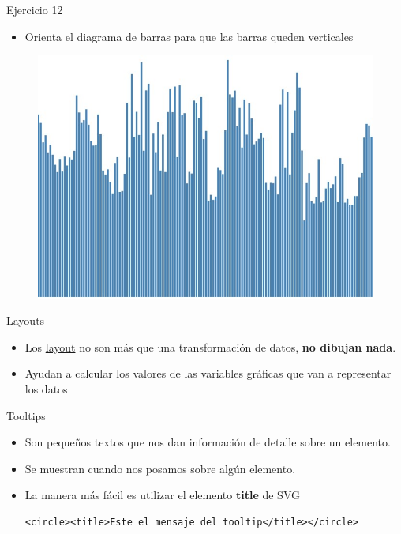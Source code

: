 \documentclass[ignorenonframetext,]{beamer}
\makeatletter
\def\ScaleIfNeededW{%
  \ifdim\Gin@nat@width>\linewidth
    \linewidth
  \else
    \Gin@nat@width
  \fi
}
\def\ScaleIfNeededH{%
  \ifdim\Gin@nat@height>0.6\textheight
    0.6\textheight
  \else
    \Gin@nat@height
  \fi
}
\let\Oldincludegraphics\includegraphics
\renewcommand{\includegraphics}[2][]{\Oldincludegraphics[width=\ScaleIfNeededW, height=\ScaleIfNeededH,keepaspectratio]{#2}}
\makeatother
\begin{document}
\begin{frame}{Ejercicio 12}

\begin{itemize}
\itemsep1pt\parskip0pt
\item
  Orienta el diagrama de barras para que las barras queden verticales
\end{itemize}

\begin{figure}[htbp]
\centering
\includegraphics{../rsc/images/ej12.jpg}
\end{figure}

\end{frame}

\begin{frame}{Layouts}

\begin{itemize}
\item
  Los \href{https://github.com/mbostock/d3/wiki/Layouts}{layout} no son
  más que una transformación de datos, \textbf{no dibujan nada}.
\item
  Ayudan a calcular los valores de las variables gráficas que van a
  representar los datos
\end{itemize}

\end{frame}

\begin{frame}[fragile]{Tooltips}

\begin{itemize}
\item
  Son pequeños textos que nos dan información de detalle sobre un
  elemento.
\item
  Se muestran cuando nos posamos sobre algún elemento.
\item
  La manera más fácil es utilizar el elemento \textbf{title} de SVG

\begin{lstlisting}
<circle><title>Este el mensaje del tooltip</title></circle>
\end{lstlisting}
\end{itemize}

\end{frame}
\end{document}
